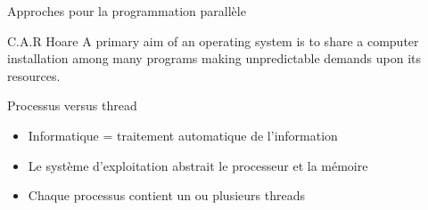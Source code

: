 
\begingroup

\begin{frame} {Approches pour la programmation parallèle}
  \begin{shadequote}{C.A.R Hoare}
    A primary aim of an operating system is to share a computer installation among many programs making unpredictable demands upon its resources.
  \end{shadequote}

  \vfill

  \begin{block}{Processus versus thread}
    \begin{itemize}
    \item \alert{Informatique} = traitement auto\alert{matique} de l'\alert{informat}ion
    \item Le système d'exploitation abstrait le \alert{processeur} et la \alert{mémoire}
    \item Chaque processus contient un ou plusieurs threads
    \end{itemize}
  \end{block}
\end{frame}

\endgroup
\endinput
